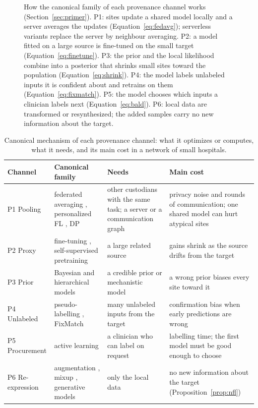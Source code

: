 \documentclass[acmsmall,screen,review]{acmart}
\theoremstyle{acmdefinition}
\begin{document}
\begin{figure}[t]
\caption{How the canonical family of each provenance channel works (Section~\ref{sec:primer}). P1: sites update a shared model locally and a server averages the updates (Equation~\eqref{eq:fedavg}); serverless variants replace the server by neighbour averaging. P2: a model fitted on a large source is fine-tuned on the small target (Equation~\eqref{eq:finetune}). P3: the prior and the local likelihood combine into a posterior that shrinks small sites toward the population (Equation~\eqref{eq:shrink}). P4: the model labels unlabeled inputs it is confident about and retrains on them (Equation~\eqref{eq:fixmatch}). P5: the model chooses which inputs a clinician labels next (Equation~\eqref{eq:bald}). P6: local data are transformed or resynthesized; the added samples carry no new information about the target.}
\label{fig:mechanisms}
\end{figure}

\begin{table}[t]
\caption{Canonical mechanism of each provenance channel: what it optimizes or computes, what it needs, and its main cost in a network of small hospitals.}
\label{tab:mechanisms}
\footnotesize
\begin{tabularx}{\linewidth}{@{}p{1.55cm}p{2.6cm}p{2.55cm}X@{}}
\toprule
Channel & Canonical family & Needs & Main cost\\
\midrule
P1 Pooling & federated averaging \cite{mcmahan2017communication}, personalized FL \cite{li2021ditto}, DP \cite{dwork2006calibrating} & other custodians with the same task; a server or a communication graph & privacy noise and rounds of communication; one shared model can hurt atypical sites\\
P2 Proxy & fine-tuning \cite{pan2010survey}, self-supervised pretraining \cite{chen2020simple,he2022masked} & a large related source & gains shrink as the source drifts from the target\\
P3 Prior & Bayesian and hierarchical models \cite{gelman2013bayesian} & a credible prior or mechanistic model & a wrong prior biases every site toward it\\
P4 Unlabeled & pseudo-labelling \cite{lee2013pseudo}, FixMatch \cite{sohn2020fixmatch} & many unlabeled inputs from the target & confirmation bias when early predictions are wrong\\
P5 Procurement & active learning \cite{settles2009active,gal2017deep} & a clinician who can label on request & labelling time; the first model must be good enough to choose\\
P6 Re-expression & augmentation \cite{shorten2019survey}, mixup \cite{zhang2018mixup}, generative models \cite{ho2020denoising} & only the local data & no new information about the target (Proposition~\ref{prop:nfl})\\
\bottomrule
\end{tabularx}
\end{table}
\end{document}

